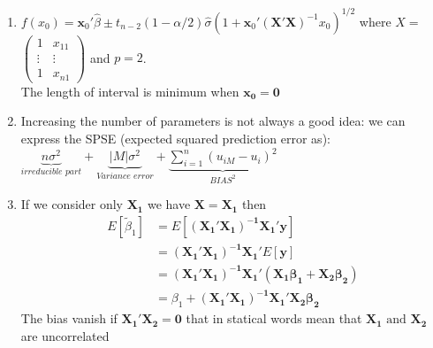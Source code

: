 \documentclass[10pt,a4paper]{article}
\begin{document}
\begin{enumerate}
		\item $ f(x_0) = \mathbf{x}_0' \hat{\beta} \pm t_{n-2}(1-\alpha / 2) \hat{\sigma} (1 + \mathbf{x}_0' (\mathbf{X'X})^{-1} x_0)^{1/2}$
		where $ X = $
		$ \left( \begin{matrix}
			1 & x_{11} \\ 
			\vdots & \vdots  \\ 
		1 & x_{n1}
			\end{matrix} \right)$ and $ p = 2 $.\\
			The length of interval is minimum when $ \mathbf{x_0 = 0}  $
			\item Increasing the number of parameters is not always a good idea: we can express the SPSE (expected squared prediction error as):
			$ \underbrace{n\sigma^2}_{irreducible\,\,  part} + \underbrace{|M|\sigma^2}_{Variance \,\, error} + \underbrace{\sum_{i=1}^{n} (u_{i M} - u_i)^2}_{BIAS^2} $
			\item If we consider only $ \mathbf{X_1} $ we have $ \mathbf{X = X_1} $ then 
			\begin{align*}
				E\left[ \tilde{\beta}_1 \right]		&= E \left[ \mathbf{(X_1'X_1)^{-1} X_1'y} \right] \\
				&=  \mathbf{(X_1'X_1)^{-1} X_1' } E \left[ \mathbf{y} \right] \\
				&=  \mathbf{(X_1'X_1)^{-1} X_1' (X_1 \beta_1 + X_2 \beta_2)} \\
				&= \beta_1 +\mathbf{(X_1'X_1)^{-1} X_1'  X_2 \beta_2}
			\end{align*}
			The bias vanish if $ \mathbf{X_1'  X_2  = 0} $ that in statical words mean that $ \mathbf{X_1} \text{ and } \mathbf{X_2} $ are uncorrelated 
	\end{enumerate}
\end{document}

